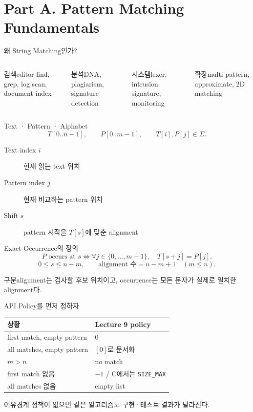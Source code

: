 \section{Part A. Pattern Matching Fundamentals}
\begin{frame}{왜 String Matching인가?}
\begin{columns}[T]
\begin{block}{검색}editor find, grep, log scan, document index\end{block}
\begin{block}{분석}DNA, plagiarism, signature detection\end{block}
\begin{block}{시스템}lexer, intrusion signature, monitoring\end{block}
\begin{block}{확장}multi-pattern, approximate, 2D matching\end{block}
\end{columns}
\end{frame}
\begin{frame}{Text · Pattern · Alphabet}
\[
T[0..n-1],\qquad P[0..m-1],\qquad T[i],P[j]\in\Sigma.
\]
\begin{description}
\item[Text index \(i\)]현재 읽는 text 위치
\item[Pattern index \(j\)]현재 비교하는 pattern 위치
\item[Shift \(s\)]pattern 시작을 \(T[s]\)에 맞춘 alignment
\end{description}
\end{frame}
\begin{frame}{Exact Occurrence의 정의}
\[
P\text{ occurs at }s
\iff
\forall j\in\{0,\ldots,m-1\},\quad T[s+j]=P[j].
\]
\[
0\le s\le n-m,\qquad\text{alignment 수}=n-m+1\quad(m\le n).
\]
\begin{alertblock}{구분}alignment는 검사할 후보 위치이고, occurrence는 모든 문자가 실제로 일치한 alignment다.\end{alertblock}
\end{frame}
\begin{frame}{API Policy를 먼저 정하자}
\small\begin{tabular}{ll}\toprule
상황&Lecture 9 policy\\\midrule
first match, empty pattern&0\\
all matches, empty pattern&\([0]\)로 문서화\\
\(m>n\)&no match\\
first match 없음&\(-1\) / C에서는 \texttt{SIZE\_MAX}\\
all matches 없음&empty list\\
\bottomrule\end{tabular}
\begin{block}{이유}경계 정책이 없으면 같은 알고리즘도 구현·테스트 결과가 달라진다.\end{block}
\end{frame}

